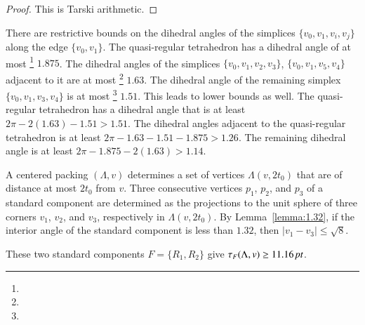 \begin{proof} This is Tarski arithmetic.
\end{proof}


There are restrictive bounds on the dihedral angles of the
simplices $\{v_0,v_1,v_i,v_j\}$ along the edge $\{v_0,v_1\}$. The
quasi-regular tetrahedron has a dihedral angle of at most%
\footnote{} $1.875$.  The dihedral angles of the
simplices $\{v_0,v_1,v_2,v_3\}$, $\{v_0,v_1,v_5,v_4\}$
adjacent to it are at most%
\footnote{}  $1.63$. The dihedral angle of the
remaining simplex $\{v_0,v_1,v_3,v_4\}$ is at most%
\footnote{} $1.51$.   This leads to lower bounds
as well. The quasi-regular tetrahedron has a dihedral angle that
is at least $2\pi - 2(1.63)-1.51 > 1.51$.  The dihedral angles
adjacent to the quasi-regular tetrahedron is at least $2\pi-
1.63-1.51-1.875> 1.26$. The remaining dihedral angle is at least
$2\pi-1.875-2(1.63) > 1.14$.

A centered packing $(\Lambda,v)$ determines a set of vertices $\Lambda(v,2t_0)$ that
are of distance at most $2t_0$ from $v$.  Three
consecutive vertices $p_1$, $p_2$, and $p_3$ of a standard component
are determined as the projections to the unit sphere of three
corners $v_1$, $v_2$, and $v_3$, respectively in $\Lambda(v,2t_0)$. By
Lemma~\ref{lemma:1.32}, if the interior angle of the standard
component is less than $1.32$, then $|v_1-v_3|\le\sqrt{8}$.

\begin{lemma} 
These two standard components $F=\{R_1,R_2\}$ give
    $\tau_F(\Lambda,v) \ge 11.16\,\hbox{\it pt}$.
\end{lemma}

